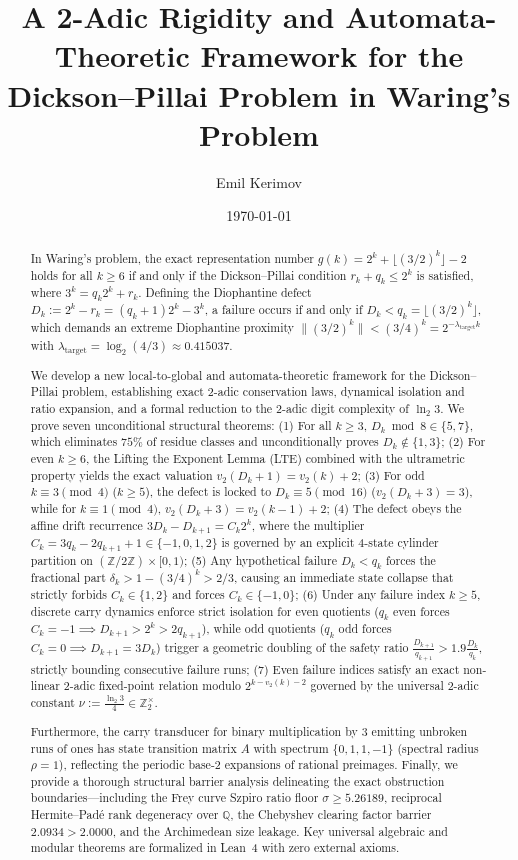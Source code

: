 \documentclass[11pt,reqno]{amsart}
\title[A 2-Adic and Automata Framework for the Dickson--Pillai Problem]{A 2-Adic Rigidity and Automata-Theoretic Framework for the Dickson--Pillai Problem in Waring's Problem}
\author{Emil Kerimov}
\date{\today}
\theoremstyle{definition}
\numberwithin{equation}{section}
\begin{document}
\begin{abstract}
In Waring's problem, the exact representation number $g(k) = 2^k + \lfloor(3/2)^k\rfloor - 2$ holds for all $k \ge 6$ if and only if the Dickson--Pillai condition $r_k + q_k \le 2^k$ is satisfied, where $3^k = q_k 2^k + r_k$. Defining the Diophantine defect $D_k := 2^k - r_k = (q_k + 1)2^k - 3^k$, a failure occurs if and only if $D_k < q_k = \lfloor(3/2)^k\rfloor$, which demands an extreme Diophantine proximity $\|(3/2)^k\| < (3/4)^k = 2^{-\lambda_{\mathrm{target}} k}$ with $\lambda_{\mathrm{target}} = \log_2(4/3) \approx 0.415037$.

We develop a new local-to-global and automata-theoretic framework for the Dickson--Pillai problem, establishing exact 2-adic conservation laws, dynamical isolation and ratio expansion, and a formal reduction to the 2-adic digit complexity of $\ln_2 3$. We prove seven unconditional structural theorems:
(1) For all $k \ge 3$, $D_k \bmod 8 \in \{5, 7\}$, which eliminates $75\%$ of residue classes and unconditionally proves $D_k \notin \{1, 3\}$;
(2) For even $k \ge 6$, the Lifting the Exponent Lemma (LTE) combined with the ultrametric property yields the exact valuation $v_2(D_k + 1) = v_2(k) + 2$;
(3) For odd $k \equiv 3 \pmod 4$ ($k \ge 5$), the defect is locked to $D_k \equiv 5 \pmod{16}$ ($v_2(D_k + 3) = 3$), while for $k \equiv 1 \pmod 4$, $v_2(D_k + 3) = v_2(k - 1) + 2$;
(4) The defect obeys the affine drift recurrence $3 D_k - D_{k+1} = C_k 2^k$, where the multiplier $C_k = 3 q_k - 2 q_{k+1} + 1 \in \{-1, 0, 1, 2\}$ is governed by an explicit 4-state cylinder partition on $(\mathbb{Z}/2\mathbb{Z}) \times [0, 1)$;
(5) Any hypothetical failure $D_k < q_k$ forces the fractional part $\delta_k > 1 - (3/4)^k > 2/3$, causing an immediate state collapse that strictly forbids $C_k \in \{1, 2\}$ and forces $C_k \in \{-1, 0\}$;
(6) Under any failure index $k \ge 5$, discrete carry dynamics enforce strict isolation for even quotients ($q_k$ even forces $C_k = -1 \implies D_{k+1} > 2^k > 2 q_{k+1}$), while odd quotients ($q_k$ odd forces $C_k = 0 \implies D_{k+1} = 3 D_k$) trigger a geometric doubling of the safety ratio $\frac{D_{k+1}}{q_{k+1}} > 1.9 \frac{D_k}{q_k}$, strictly bounding consecutive failure runs;
(7) Even failure indices satisfy an exact non-linear 2-adic fixed-point relation modulo $2^{k - v_2(k) - 2}$ governed by the universal 2-adic constant $\nu := \frac{\ln_2 3}{4} \in \mathbb{Z}_2^\times$.

Furthermore, the carry transducer for binary multiplication by $3$ emitting unbroken runs of ones has state transition matrix $A$ with spectrum $\{0, 1, 1, -1\}$ (spectral radius $\rho = 1$), reflecting the periodic base-2 expansions of rational preimages. Finally, we provide a thorough structural barrier analysis delineating the exact obstruction boundaries—including the Frey curve Szpiro ratio floor $\sigma \ge 5.26189$, reciprocal Hermite--Padé rank degeneracy over $\mathbb{Q}$, the Chebyshev clearing factor barrier $2.0934 > 2.0000$, and the Archimedean size leakage. Key universal algebraic and modular theorems are formalized in Lean~4 with zero external axioms.
\end{abstract}
\end{document}
